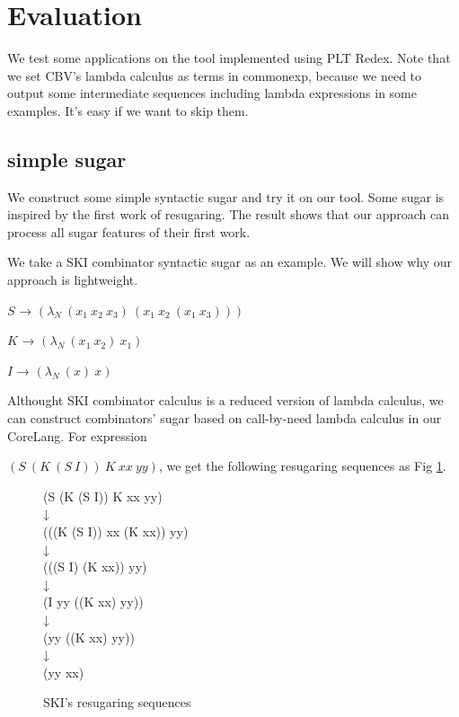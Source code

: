 \section{Evaluation}
\label{sec6}

We test some applications on the tool implemented using PLT Redex. Note that we set CBV's lambda calculus as terms in commonexp, because we need to output some intermediate sequences including lambda expressions in some examples. It's easy if we want to skip them.

\subsection{simple sugar}
\label{mark:simple}

We construct some simple syntactic sugar and try it on our tool. Some sugar is inspired by the first work of resugaring\cite{resugaring}. The result shows that our approach can process all sugar features of their first work.

We take a SKI combinator syntactic sugar as an example. We will show why our approach is lightweight.

\begin{flushleft}
	$S$ → $(\lambda _{N}~(x_{1}~x_{2}~x_{3})~(x_{1}~x_{2}~(x_{1}~x_{3})))$
	
	$K$ → $(\lambda _{N}~(x_{1}~x_{2})~x_{1})$
	
	$I$ → $(\lambda _{N}~(x)~x)$
\end{flushleft}

Althought SKI combinator calculus is a reduced version of lambda calculus, we can construct combinators' sugar based on call-by-need lambda calculus in our CoreLang. For expression

 $(S~(K~(S~I))~K~xx~yy)$, we get the following resugaring sequences as Fig \ref{fig:SKI}.

\begin{figure}[ht]
	\centering
	\parbox[t]{\textwidth}{
				\begin{center}
				{
					\small\selectfont
					(S (K (S I)) K xx yy)\\
					↓\\
					(((K (S I)) xx (K xx)) yy)\\
					↓\\
					(((S I) (K xx)) yy)\\
					↓\\
					(I yy ((K xx) yy))\\
					↓\\
					(yy ((K xx) yy))\\
					↓\\
					(yy xx)
				}
				\end{center}
			}
	\caption{SKI's resugaring sequences}
	\label{fig:SKI}
\end{figure}


